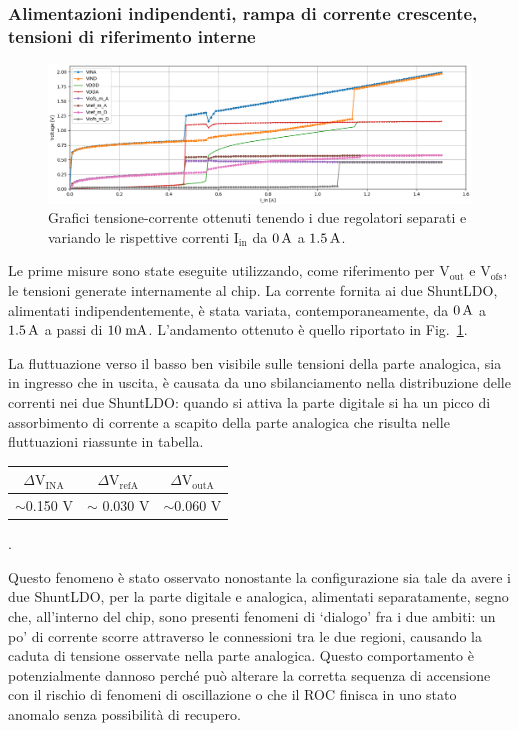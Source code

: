 \subsubsection{Alimentazioni indipendenti, rampa di corrente crescente, tensioni di riferimento interne}
\label{sec:iui}

\begin{figure}
\centering
\includegraphics[width=\textwidth]{Immagini/IUI2}
\caption{Grafici tensione-corrente ottenuti tenendo i due regolatori separati e variando le rispettive correnti $\mathrm{I_{in}}$ da $0\rm \, A$ a $1.5\rm \, A$.}%
\label{IUI}
\end{figure}
Le prime misure sono state eseguite utilizzando, come riferimento per $\mathrm{V_{out}}$ e $\mathrm{V_{ofs}}$, le tensioni generate internamente al chip.
La corrente fornita ai due ShuntLDO, alimentati indipendentemente, è stata variata, contemporaneamente, da $0\rm \, A$ a $1.5\rm \, A$ a passi di $10\rm \; mA$.
L'andamento ottenuto è quello riportato in Fig.~\ref{IUI}.

La fluttuazione verso il basso ben visibile sulle tensioni della parte analogica, sia in ingresso che in uscita, è causata da uno sbilanciamento nella distribuzione delle correnti nei due ShuntLDO: quando si attiva la parte digitale si ha un picco di assorbimento di corrente a scapito della parte analogica che risulta nelle fluttuazioni riassunte in tabella.
\begin{center}
\begin{tabular}{ccc}
\hline
$\Delta \mathrm{V_{INA}}$ & $\Delta \mathrm{V_{refA}}$ &$\Delta \mathrm{V_{outA}}$  \\ \hline
$\sim$0.150 V & $\sim$ 0.030 V& $\sim$0.060 V\\ \hline     
\end{tabular}.
\end{center}
Questo fenomeno è stato osservato nonostante la configurazione sia tale da avere i due ShuntLDO, per la parte digitale e analogica, alimentati separatamente, segno che, all'interno del chip, sono presenti fenomeni di `dialogo' fra i due ambiti: un po' di corrente scorre attraverso le connessioni tra le due regioni, causando la caduta di tensione osservate nella parte analogica.
Questo comportamento è potenzialmente dannoso perch\'e pu\`o alterare la corretta sequenza di accensione con il rischio di fenomeni di oscillazione o che il ROC finisca in uno stato anomalo senza possibilit\`a di recupero.


